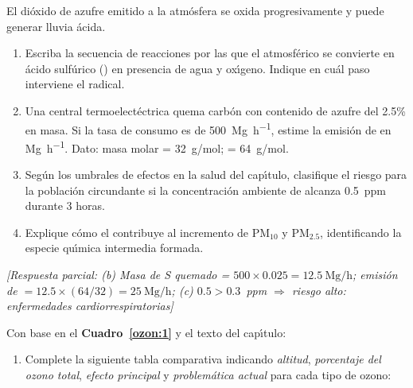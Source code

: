 \begin{bloque_ejercicios}
\begin{ejercicios}
\item El di\'oxido de azufre emitido a la atm\'osfera se oxida
progresivamente y puede generar lluvia \'acida.

\begin{enumerate}[label=\alph*)]
    \item Escriba la secuencia de reacciones por las que el 
          atmosf\'erico se convierte en \'acido sulf\'urico ()
          en presencia de agua y ox\'{\i}geno. Indique en cu\'al paso
          interviene el  radical.

    \item Una central termoelect\'ectrica quema carb\'on con contenido
          de azufre del 2.5\% en masa. Si la tasa de consumo es de
          \SI{500}{\mega\gram\per\hour}, estime la emisi\'on de 
          en \si{\mega\gram\per\hour}. Dato: masa molar  = 32~g/mol;
           = 64~g/mol.

    \item Seg\'un los umbrales de efectos en la salud del cap\'{\i}tulo,
          clasifique el riesgo para la poblaci\'on circundante si
          la concentraci\'on ambiente de  alcanza 0.5~ppm
          durante 3 horas.

    \item Explique c\'omo el  contribuye al incremento de
          PM$_{10}$ y PM$_{2.5}$, identificando la especie qu\'{\i}mica
          intermedia formada.
\end{enumerate}

\textit{[Respuesta parcial:
(b) Masa de S quemado = $500 \times 0.025 = \SI{12.5}{\mega\gram\per\hour}$;
emisi\'on de  $= 12.5 \times (64/32) = \SI{25}{\mega\gram\per\hour}$;
(c) $0.5 > 0.3$~ppm $\Rightarrow$ riesgo alto: enfermedades
cardiorrespiratorias]}

\item Con base en el \textbf{Cuadro~\ref{ozon:1}} y el texto del cap\'{\i}tulo:

\begin{enumerate}[label=\alph*)]
    \item Complete la siguiente tabla comparativa indicando
          \textit{altitud}, \textit{porcentaje del ozono total},
          \textit{efecto principal} y \textit{problem\'atica actual}
          para cada tipo de ozono:


\end{enumerate}
\end{ejercicios}
\end{bloque_ejercicios}
